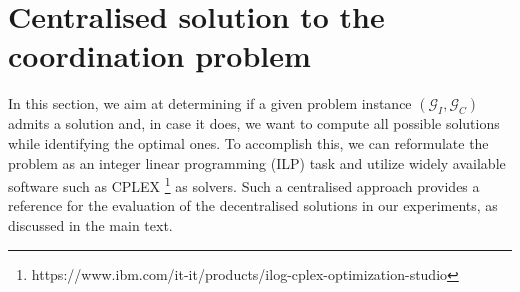 \section{Centralised solution to the coordination problem}\label{sec:centralised_appr}

In this section, we aim at determining if a given problem instance $(\mathcal{G}_I, \mathcal{G}_C)$ admits a solution and, in case it does, we want to compute all possible solutions while identifying the optimal ones.
To accomplish this, we can reformulate the problem as an integer linear programming (ILP) task and utilize widely available software such as CPLEX \footnote{https://www.ibm.com/it-it/products/ilog-cplex-optimization-studio} as solvers.
%
%
%
Such a centralised approach provides a reference for the evaluation of the decentralised solutions in our experiments, as discussed in the main text. 

